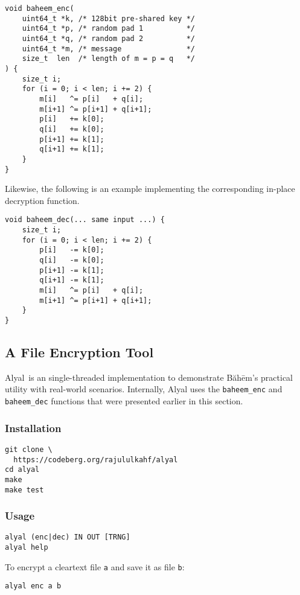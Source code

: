 \documentclass[twocolumn,hidelinks]{article}
\newcommand{\baheem}{Băhēm}
\newcommand{\alyal}{Alyal}
\begin{document}
\begin{verbatim}
void baheem_enc(
    uint64_t *k, /* 128bit pre-shared key */
    uint64_t *p, /* random pad 1          */
    uint64_t *q, /* random pad 2          */
    uint64_t *m, /* message               */
    size_t  len  /* length of m = p = q   */
) {
    size_t i;
    for (i = 0; i < len; i += 2) {
        m[i]   ^= p[i]   + q[i];
        m[i+1] ^= p[i+1] + q[i+1];
        p[i]   += k[0];
        q[i]   += k[0];
        p[i+1] += k[1];
        q[i+1] += k[1];
    }
}
\end{verbatim}
Likewise, the following is an example implementing the corresponding
in-place decryption function.
\begin{verbatim}
void baheem_dec(... same input ...) {
    size_t i;
    for (i = 0; i < len; i += 2) {
        p[i]   -= k[0];
        q[i]   -= k[0];
        p[i+1] -= k[1];
        q[i+1] -= k[1];
        m[i]   ^= p[i]   + q[i];
        m[i+1] ^= p[i+1] + q[i+1];
    }
}
\end{verbatim}


\subsection{A File Encryption Tool}
\alyal\ is an single-threaded implementation to demonstrate \baheem's
practical utility with real-world scenarios.  Internally, Alyal uses the
\texttt{baheem\_enc} and \texttt{baheem\_dec} functions that were presented
earlier in this section.

\subsubsection{Installation}
\begin{verbatim}
git clone \
  https://codeberg.org/rajululkahf/alyal
cd alyal
make
make test
\end{verbatim}

\subsubsection{Usage}

\begin{verbatim}
alyal (enc|dec) IN OUT [TRNG]
alyal help
\end{verbatim}

To encrypt a cleartext file \texttt{a} and save it as file \texttt{b}:
\begin{verbatim}
alyal enc a b
\end{verbatim}
\end{document}
